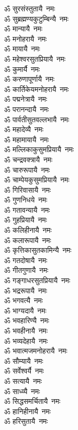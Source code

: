 \begin{flushleft}
\begin{multicols}{2}
ॐ सुरसंस्तुतायै~नमः\hfill{}\\
ॐ सुब्रह्मण्यकुटुम्बिन्यै~नमः\\
ॐ मान्यायै~नमः\\
ॐ मनोहरायै~नमः\\
ॐ मायायै~नमः\\
ॐ महेश्वरसुतप्रियायै~नमः\\
ॐ कुमार्यै~नमः\\
ॐ करुणापूर्णायै~नमः\\
ॐ कार्तिकेयमनोहरायै~नमः\\
ॐ पद्मनेत्रायै~नमः\\
ॐ परानन्दायै~नमः\hfill{}\\
ॐ पार्वतीसुतवल्लभायै~नमः\\
ॐ महादेव्यै~नमः\\
ॐ महामायायै~नमः\\
ॐ मल्लिकाकुसुमप्रियायै~नमः\\
ॐ चन्द्रवक्त्रायै~नमः\\
ॐ चारुरूपायै~नमः\\
ॐ चाम्पेयकुसुमप्रियायै~नमः\\
ॐ गिरिवासायै~नमः\\
ॐ गुणनिधये~नमः\\
ॐ गतावन्यायै~नमः\hfill{}\\
ॐ गुहप्रियायै~नमः\\
ॐ कलिहीनायै~नमः\\
ॐ कलारूपायै~नमः\\
ॐ कृत्तिकासुतकामिन्यै~नमः\\
ॐ गतदोषायै~नमः\\
ॐ गीतगुणायै~नमः\\
ॐ गङ्गाधरसुतप्रियायै~नमः\\
ॐ भद्ररूपायै~नमः\\
ॐ भगवत्यै~नमः\\
ॐ भाग्यदायै~नमः\hfill{}\\
ॐ भवहारिण्यै~नमः\\
ॐ भवहीनायै~नमः\\
ॐ भव्यदेहायै~नमः\\
ॐ भवात्मजमनोहरायै~नमः\\
ॐ सौम्यायै~नमः\\
ॐ सर्वेश्वर्यै~नमः\\
ॐ सत्यायै~नमः\\
ॐ साध्व्यै~नमः\\
ॐ सिद्धसमर्चितायै~नमः\\
ॐ हानिहीनायै~नमः\hfill{}\\
ॐ हरिसुतायै~नमः\\

\end{multicols}
\end{flushleft}
